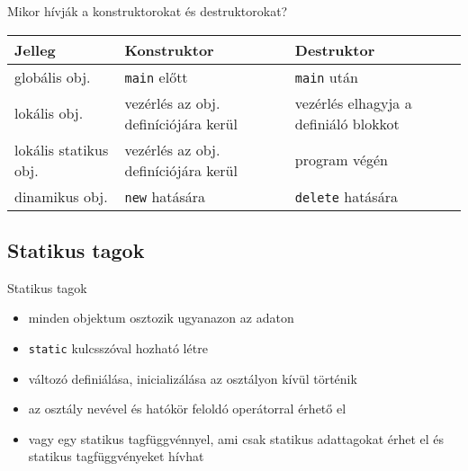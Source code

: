\documentclass[usenames,dvipsnames,aspectratio=169]{beamer}
\begin{document}
\begin{frame}
    Mikor hívják a konstruktorokat és destruktorokat?
    \begin{center}
        \begin{tabular}{ p{3cm}|p{4.5cm}|p{4.5cm} } 
        Jelleg & Konstruktor & Destruktor \\
        \hline
        globális obj. & \texttt{main} előtt & \texttt{main} után \\
        lokális obj. & vezérlés az obj. definíciójára kerül & vezérlés elhagyja a definiáló blokkot \\
        lokális statikus obj. & vezérlés az obj. definíciójára kerül & program végén \\
        dinamikus obj. & \texttt{new} hatására & \texttt{delete} hatására
        \end{tabular}
    \end{center}
\end{frame}

\subsection{Statikus tagok}

\begin{frame}
    Statikus tagok
    \begin{itemize}
        \item minden objektum osztozik ugyanazon az adaton
        \item \texttt{static} kulcsszóval hozható létre
        \item változó definiálása, inicializálása  az osztályon kívül történik
        \item az osztály nevével és hatókör feloldó operátorral érhető el
        \item vagy egy statikus tagfüggvénnyel, ami csak statikus adattagokat érhet el és statikus tagfüggvényeket hívhat
    \end{itemize}
\end{frame}

\begin{frame}
    \begin{exampleblock}{}
        \small
        
        
    \end{exampleblock}
\end{frame}
\end{document}
